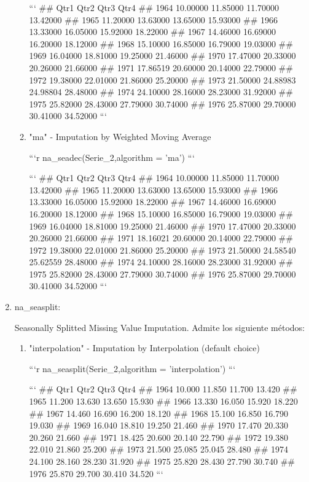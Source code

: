 \documentclass[
]{article}
\begin{document}
\begin{enumerate}
\begin{enumerate}
```
##          Qtr1     Qtr2     Qtr3     Qtr4
## 1964 10.00000 11.85000 11.70000 13.42000
## 1965 11.20000 13.63000 13.65000 15.93000
## 1966 13.33000 16.05000 15.92000 18.22000
## 1967 14.46000 16.69000 16.20000 18.12000
## 1968 15.10000 16.85000 16.79000 19.03000
## 1969 16.04000 18.81000 19.25000 21.46000
## 1970 17.47000 20.33000 20.26000 21.66000
## 1971 17.86519 20.60000 20.14000 22.79000
## 1972 19.38000 22.01000 21.86000 25.20000
## 1973 21.50000 24.88983 24.98804 28.48000
## 1974 24.10000 28.16000 28.23000 31.92000
## 1975 25.82000 28.43000 27.79000 30.74000
## 1976 25.87000 29.70000 30.41000 34.52000
```
\item "ma" - Imputation by Weighted Moving Average

```r
na_seadec(Serie_2,algorithm = 'ma')
```

```
##          Qtr1     Qtr2     Qtr3     Qtr4
## 1964 10.00000 11.85000 11.70000 13.42000
## 1965 11.20000 13.63000 13.65000 15.93000
## 1966 13.33000 16.05000 15.92000 18.22000
## 1967 14.46000 16.69000 16.20000 18.12000
## 1968 15.10000 16.85000 16.79000 19.03000
## 1969 16.04000 18.81000 19.25000 21.46000
## 1970 17.47000 20.33000 20.26000 21.66000
## 1971 18.16021 20.60000 20.14000 22.79000
## 1972 19.38000 22.01000 21.86000 25.20000
## 1973 21.50000 24.58540 25.62559 28.48000
## 1974 24.10000 28.16000 28.23000 31.92000
## 1975 25.82000 28.43000 27.79000 30.74000
## 1976 25.87000 29.70000 30.41000 34.52000
```
\end{enumerate}
\item

na\_seasplit:

Seasonally Splitted Missing Value Imputation. Admite los siguiente
métodos:

\begin{enumerate}
\item "interpolation" - Imputation by Interpolation (default choice)

```r
na_seasplit(Serie_2,algorithm = 'interpolation')
```

```
##        Qtr1   Qtr2   Qtr3   Qtr4
## 1964 10.000 11.850 11.700 13.420
## 1965 11.200 13.630 13.650 15.930
## 1966 13.330 16.050 15.920 18.220
## 1967 14.460 16.690 16.200 18.120
## 1968 15.100 16.850 16.790 19.030
## 1969 16.040 18.810 19.250 21.460
## 1970 17.470 20.330 20.260 21.660
## 1971 18.425 20.600 20.140 22.790
## 1972 19.380 22.010 21.860 25.200
## 1973 21.500 25.085 25.045 28.480
## 1974 24.100 28.160 28.230 31.920
## 1975 25.820 28.430 27.790 30.740
## 1976 25.870 29.700 30.410 34.520
```


\end{enumerate}
\end{enumerate}
\end{document}
